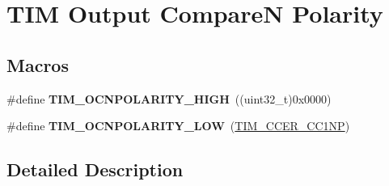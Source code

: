 \hypertarget{group___t_i_m___output___compare___n___polarity}{}\section{T\+IM Output CompareN Polarity}
\label{group___t_i_m___output___compare___n___polarity}
\subsection*{Macros}
\begin{DoxyCompactItemize}
\item 
\#define {\bfseries T\+I\+M\+\_\+\+O\+C\+N\+P\+O\+L\+A\+R\+I\+T\+Y\+\_\+\+H\+I\+GH}~((uint32\+\_\+t)0x0000)\hypertarget{group___t_i_m___output___compare___n___polarity_gad5dbeb61519e4fd55db3a4d136e96316}{}\label{group___t_i_m___output___compare___n___polarity_gad5dbeb61519e4fd55db3a4d136e96316}

\item 
\#define {\bfseries T\+I\+M\+\_\+\+O\+C\+N\+P\+O\+L\+A\+R\+I\+T\+Y\+\_\+\+L\+OW}~(\hyperlink{group___peripheral___registers___bits___definition_ga403fc501d4d8de6cabee6b07acb81a36}{T\+I\+M\+\_\+\+C\+C\+E\+R\+\_\+\+C\+C1\+NP})\hypertarget{group___t_i_m___output___compare___n___polarity_gadb44419c891a58e2cde11cc016f71a14}{}\label{group___t_i_m___output___compare___n___polarity_gadb44419c891a58e2cde11cc016f71a14}

\end{DoxyCompactItemize}


\subsection{Detailed Description}
